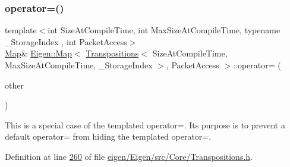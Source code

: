 \mbox{\label{class_eigen_1_1_map_3_01_transpositions_3_01_size_at_compile_time_00_01_max_size_at_compile_timecc993082d7c0ba51ca94b27e97da8dd3_aaafbdb07fbd22f5ac9171e6b03d783f4}} 
\subsubsection{\texorpdfstring{operator=()}{operator=()}\hspace{0.1cm}{\footnotesize\ttfamily [3/4]}}
{\footnotesize\ttfamily template$<$int Size\+At\+Compile\+Time, int Max\+Size\+At\+Compile\+Time, typename \+\_\+\+Storage\+Index , int Packet\+Access$>$ \\
\hyperlink{group___core___module_class_eigen_1_1_map}{Map}\& \hyperlink{group___core___module_class_eigen_1_1_map}{Eigen\+::\+Map}$<$ \hyperlink{group___core___module_class_eigen_1_1_transpositions}{Transpositions}$<$ Size\+At\+Compile\+Time, Max\+Size\+At\+Compile\+Time, \+\_\+\+Storage\+Index $>$, Packet\+Access $>$\+::operator= (\begin{DoxyParamCaption}\item[{const \hyperlink{group___core___module_class_eigen_1_1_map}{Map}$<$ \hyperlink{group___core___module_class_eigen_1_1_transpositions}{Transpositions}$<$ Size\+At\+Compile\+Time, Max\+Size\+At\+Compile\+Time, \+\_\+\+Storage\+Index $>$, Packet\+Access $>$ \&}]{other }\end{DoxyParamCaption})\hspace{0.3cm}{\ttfamily [inline]}}

This is a special case of the templated operator=. Its purpose is to prevent a default operator= from hiding the templated operator=. 

Definition at line \hyperlink{eigen_2_eigen_2src_2_core_2_transpositions_8h_source_l00260}{260} of file \hyperlink{eigen_2_eigen_2src_2_core_2_transpositions_8h_source}{eigen/\+Eigen/src/\+Core/\+Transpositions.\+h}.


